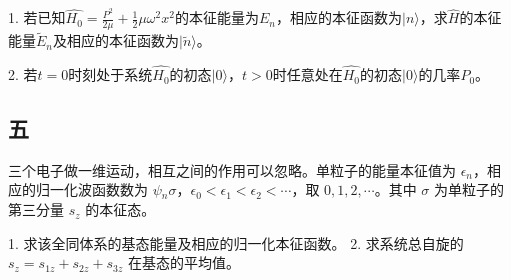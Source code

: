 1. 若已知$\hat{H_0} = \frac{P^2}{2\mu} + \frac{1}{2}\mu \omega^2 x^2$的本征能量为$E_n$，相应的本征函数为$|n\rangle$，求$\hat{H}$的本征能量$\tilde {E}_n$及相应的本征函数为$|\tilde n\rangle$。


2. 若$t=0$时刻处于系统$\hat{H_0}$的初态$|0\rangle$，$t>0$时任意处在$\hat{H_0}$的初态$|0\rangle$的几率$P_0$。

\subsection{五}
三个电子做一维运动，相互之间的作用可以忽略。单粒子的能量本征值为 $\epsilon_n$，相应的归一化波函数数为 $\psi{_n\sigma}$，$\epsilon_0 < \epsilon_1 < \epsilon_2 < \cdots$，取 $0, 1, 2, \cdots$。其中 $\sigma$ 为单粒子的第三分量 $s_z$ 的本征态。

1. 求该全同体系的基态能量及相应的归一化本征函数。
2. 求系统总自旋的 $s_z = s_{1z} + s_{2z} + s_{3z}$ 在基态的平均值。